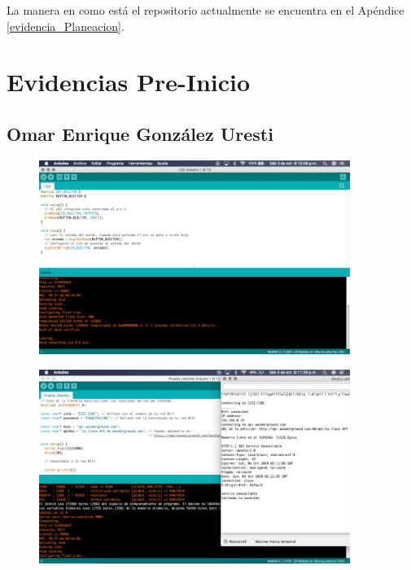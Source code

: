\documentclass[12pt]{article}
\begin{document}
La manera en como está el repositorio actualmente se
encuentra en el Apéndice \ref{evidencia_Planeacion}.

\newpage
\appendix
\section{Evidencias Pre-Inicio}\label{evidencias_PreInicio}
\subsection{Omar Enrique González Uresti}
\begin{figure}[!h]
\centering
\includegraphics[width = 0.9\textwidth]{omar1}
\end{figure}

\begin{figure}[!h]
\centering
\includegraphics[width = 0.9\textwidth]{omar2}
\end{figure}

\newpage
\end{document}
